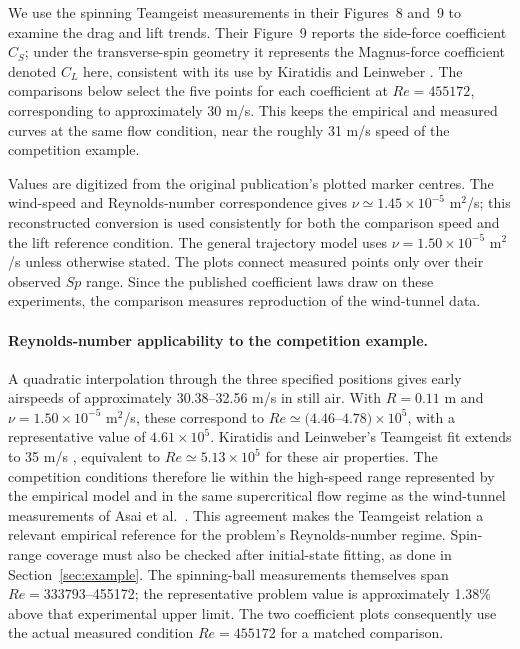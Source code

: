 \documentclass[12pt,letterpaper]{article}
\begin{document}
We use the spinning Teamgeist measurements in their Figures~8 and~9 to examine the drag and lift trends. Their Figure~9 reports the side-force coefficient $C_S$; under the transverse-spin geometry it represents the Magnus-force coefficient denoted $C_L$ here, consistent with its use by Kiratidis and Leinweber \cite{asai2007,kiratidis2018}. The comparisons below select the five points for each coefficient at $Re=455172$, corresponding to approximately 30 m/s. This keeps the empirical and measured curves at the same flow condition, near the roughly 31 m/s speed of the competition example.

Values are digitized from the original publication's plotted marker centres. The wind-speed and Reynolds-number correspondence gives $\nu\simeq1.45\times10^{-5}$ m$^2$/s; this reconstructed conversion is used consistently for both the comparison speed and the lift reference condition. The general trajectory model uses $\nu=1.50\times10^{-5}$ m$^2$/s unless otherwise stated. The plots connect measured points only over their observed $Sp$ range. Since the published coefficient laws draw on these experiments, the comparison measures reproduction of the wind-tunnel data.

\paragraph{Reynolds-number applicability to the competition example.}
A quadratic interpolation through the three specified positions gives early airspeeds of approximately 30.38--32.56 m/s in still air. With $R=0.11$ m and $\nu=1.50\times10^{-5}$ m$^2$/s, these correspond to $Re\simeq(4.46$--$4.78)\times10^5$, with a representative value of $4.61\times10^5$. Kiratidis and Leinweber's Teamgeist fit extends to 35 m/s \cite{kiratidis2018}, equivalent to $Re\simeq5.13\times10^5$ for these air properties. The competition conditions therefore lie within the high-speed range represented by the empirical model and in the same supercritical flow regime as the wind-tunnel measurements of Asai et al.\ \cite{asai2007}. This agreement makes the Teamgeist relation a relevant empirical reference for the problem's Reynolds-number regime. Spin-range coverage must also be checked after initial-state fitting, as done in Section~\ref{sec:example}. The spinning-ball measurements themselves span $Re=333793$--455172; the representative problem value is approximately 1.38\% above that experimental upper limit. The two coefficient plots consequently use the actual measured condition $Re=455172$ for a matched comparison.
\end{document}
